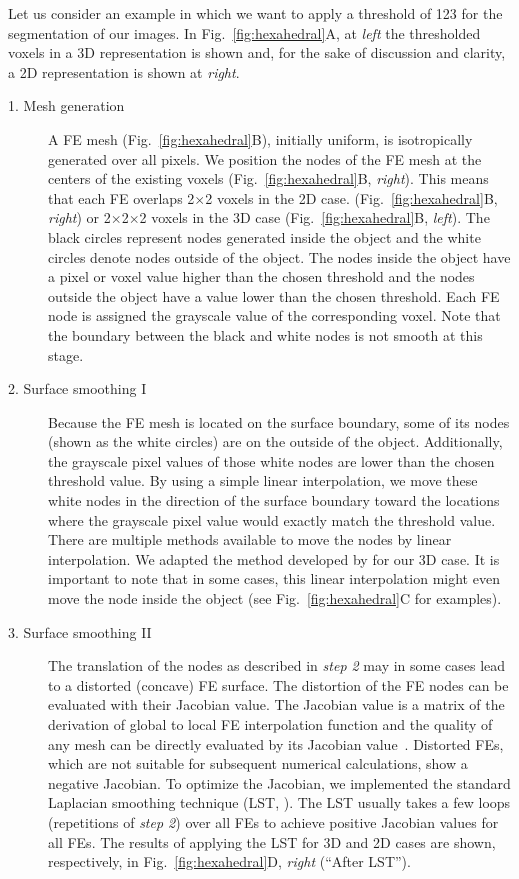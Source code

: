 Let us consider an example in which we want to apply a threshold of 123 for the segmentation of our images. In Fig.~\ref{fig:hexahedral}A, at \textit{left} the thresholded voxels in a 3D representation is shown and, for the sake of discussion and clarity, a 2D representation is shown at \textit{right}.
\begin{description}
	\item[1. Mesh generation] A FE mesh (Fig.~\ref{fig:hexahedral}B), initially uniform, is isotropically generated over all pixels. We position the nodes of the FE mesh at the centers of the existing voxels (Fig.~\ref{fig:hexahedral}B, \textit{right}). This means that each FE overlaps 2$\times$2 voxels in the 2D case. (Fig.~\ref{fig:hexahedral}B, \textit{right}) or 2$\times$2$\times$2 voxels in the 3D case (Fig.~\ref{fig:hexahedral}B, \textit{left}). The black circles represent nodes generated inside the object and the white circles denote nodes outside of the object. The nodes inside the object have a pixel or voxel value higher than the chosen threshold and the nodes outside the object have a value lower than the chosen threshold. Each FE node is assigned the grayscale value of the corresponding voxel. Note that the boundary between the black and white nodes is not smooth at this stage.
	\item[2. Surface smoothing I] Because the FE mesh is located on the surface boundary, some of its nodes (shown as the white circles) are on the outside of the object. Additionally, the grayscale pixel values of those white nodes are lower than the chosen threshold value. By using a simple linear interpolation, we move these white nodes in the direction of the surface boundary toward the locations where the grayscale pixel value would exactly match the threshold value. There are multiple methods available to move the nodes by linear interpolation. We adapted the method developed by \citet{Schneiders1996} for our 3D case. It is important to note that in some cases, this linear interpolation might even move the node inside the object (see Fig.~\ref{fig:hexahedral}C for examples).
	\item[3. Surface smoothing II] The translation of the nodes as described in \textit{step 2} may in some cases lead to a distorted (concave) FE surface. The distortion of the FE nodes can be evaluated with their Jacobian value. The Jacobian value is a matrix of the derivation of global to local FE interpolation function and the quality of any mesh can be directly evaluated by its Jacobian value~\cite{Bathe1995}. Distorted FEs, which are not suitable for subsequent numerical calculations, show a negative Jacobian. To optimize the Jacobian, we implemented the standard Laplacian smoothing technique (LST, \cite{Freitag2000}). The LST usually takes a few loops (repetitions of \textit{step 2}) over all FEs to achieve positive Jacobian values for all FEs. The results of applying the LST for 3D and 2D cases are shown, respectively, in Fig.~\ref{fig:hexahedral}D, \textit{right} (``After LST'').
\end{description}
